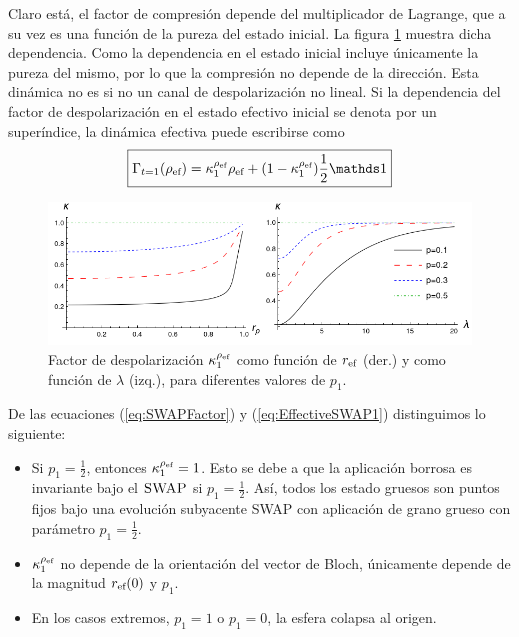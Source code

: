 Claro está, el factor de compresión depende del multiplicador de Lagrange, que a su vez es una función de la pureza del estado inicial. La figura \ref{fig:SWAPFactor2Drl} muestra dicha dependencia. Como la dependencia en el estado inicial incluye únicamente la pureza del mismo, por lo que la compresión no depende de la dirección. Esta dinámica no es si no un canal de despolarización no lineal. Si la dependencia del factor de despolarización en el estado efectivo inicial se denota por un superíndice, la dinámica efectiva puede escribirse como
\begin{equation}\label{eq:EffectiveSWAP1}
  \boxed{\Gamma_{t=1}(\rho_{\ef})=\kappa_{1}^{\rho_{\ef}}\rho_{\ef}+(1-\kappa_{1}^{\rho_{\ef}})\frac{1}{2}\Id}
\end{equation}
\begin{figure}[ht!]
  \centering
  \includegraphics[width=0.9\linewidth]{chapter3/figures_toy/ContractionFactorSWAP_2D_both.png}
  \caption{Factor de despolarización $\kappa_{1}^{\rho_{\text{ef}}}$ como función de $r_{\text{ef}}$ (der.) y como función de $\lambda$ (izq.), para diferentes valores de $p_{1}$.}
  \label{fig:SWAPFactor2Drl}
\end{figure}

De las ecuaciones (\ref{eq:SWAPFactor}) y (\ref{eq:EffectiveSWAP1}) distinguimos lo siguiente:
\begin{itemize}
  \item Si $p_{1}=\frac{1}{2}$, entonces $\kappa_{1}^{\rho_{\text{ef}}}=1$. Esto se debe a que la aplicación borrosa es invariante bajo el $\textsc{SWAP}$ si $p_{1}=\frac{1}{2}$. Así, todos los estado gruesos son puntos fijos bajo una evolución subyacente SWAP con aplicación de grano grueso con parámetro $p_{1}=\frac{1}{2}$.
  \item $\kappa_{1}^{\rho_{\text{ef}}}$ no depende de la orientación del vector de Bloch, únicamente depende de la magnitud $r_{\text{ef}}(0)$ y $p_{1}$.
  \item En los casos extremos, $p_{1}=1$ o $p_{1}=0$, la esfera colapsa al origen.
\end{itemize}


